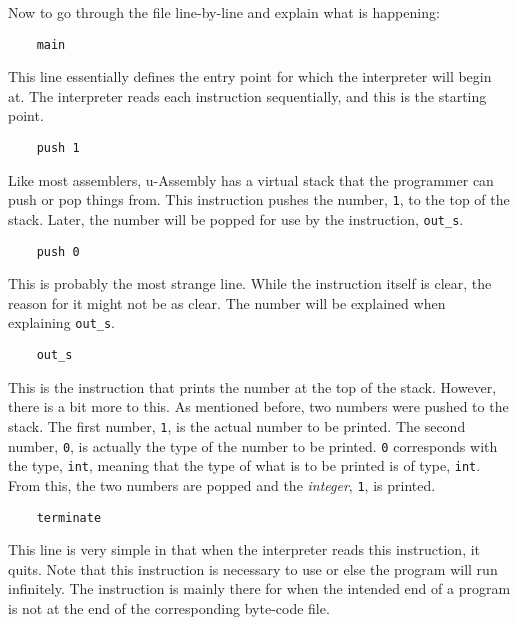 \documentclass[12pt]{report}
\begin{document}
  Now to go through the file line-by-line and explain what is happening:
  \begin{verbatim}
	main
  \end{verbatim}
  This line essentially defines the entry point for which the interpreter will begin at.
  The interpreter reads each instruction sequentially, and this is the starting point.
  \begin{verbatim}
	push 1
  \end{verbatim}
  Like most assemblers, u-Assembly has a virtual stack that the programmer can push or
  pop things from.  This instruction pushes the number, \verb|1|, to the top of the
  stack.  Later, the number will be popped for use by the instruction, \verb|out_s|.
  \begin{verbatim}
	push 0
  \end{verbatim}
  This is probably the most strange line.  While the instruction itself is clear, the
  reason for it might not be as clear.  The number will be explained when explaining
  \verb|out_s|.
  \begin{verbatim}
	out_s
  \end{verbatim}
  This is the instruction that prints the number at the top of the stack.  However, there
  is a bit more to this.  As mentioned before, two numbers were pushed to the stack.  The
  first number, \verb|1|, is the actual number to be printed.  The second number, 
  \verb|0|, is actually the type of the number to be printed.  \verb|0| corresponds with
  the type, \verb|int|, meaning that the type of what is to be printed is of type,
  \verb|int|.  From this, the two numbers are popped and the \emph{integer}, \verb|1|,
  is printed.
  \begin{verbatim}
	terminate
  \end{verbatim}
  This line is very simple in that when the interpreter reads this instruction, it quits.
  Note that this instruction is necessary to use or else the program will run infinitely.
  The instruction is mainly there for when the intended end of a program is not at the
  end of the corresponding byte-code file.
  \newline
\end{document}
